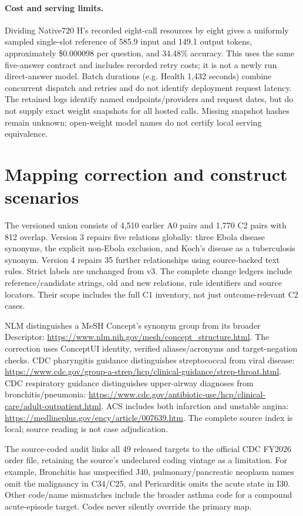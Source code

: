 \paragraph{Cost and serving limits.}
Dividing Native720 H's recorded eight-call resources by eight gives a uniformly sampled single-slot reference of 585.9 input and 149.1 output tokens, approximately \$0.000098 per question, and 34.48\% accuracy. This uses the same five-answer contract and includes recorded retry costs; it is not a newly run direct-answer model. Batch durations (e.g. Health 1,432 seconds) combine concurrent dispatch and retries and do not identify deployment request latency. The retained logs identify named endpoints/providers and request dates, but do not supply exact weight snapshots for all hosted calls. Missing snapshot hashes remain unknown; open-weight model names do not certify local serving equivalence.

\section{Mapping correction and construct scenarios}\label{app:mapping}
The versioned union consists of 4,510 earlier A0 pairs and 1,770 C2 pairs with 812 overlap. Version 3 repairs five relations globally: three Ebola disease synonyms, the explicit non-Ebola exclusion, and Koch's disease as a tuberculosis synonym. Version 4 repairs 35 further relationships using source-backed text rules. Strict labels are unchanged from v3. The complete change ledgers include reference/candidate strings, old and new relations, rule identifiers and source locators. Their scope includes the full C1 inventory, not just outcome-relevant C2 cases.

NLM distinguishes a MeSH Concept's synonym group from its broader Descriptor: \url{https://www.nlm.nih.gov/mesh/concept_structure.html}. The correction uses ConceptUI identity, verified aliases/acronyms and target-negation checks. CDC pharyngitis guidance distinguishes streptococcal from viral disease: \url{https://www.cdc.gov/group-a-strep/hcp/clinical-guidance/strep-throat.html}. CDC respiratory guidance distinguishes upper-airway diagnoses from bronchitis/pneumonia: \url{https://www.cdc.gov/antibiotic-use/hcp/clinical-care/adult-outpatient.html}. ACS includes both infarction and unstable angina: \url{https://medlineplus.gov/ency/article/007639.htm}. The complete source index is local; source reading is not case adjudication.

The source-coded audit links all 49 released targets to the official CDC FY2026 order file, retaining the source's undeclared coding vintage as a limitation. For example, Bronchitis has unspecified J40, pulmonary/pancreatic neoplasm names omit the malignancy in C34/C25, and Pericarditis omits the acute state in I30. Other code/name mismatches include the broader asthma code for a compound acute-episode target. Codes never silently override the primary map.

